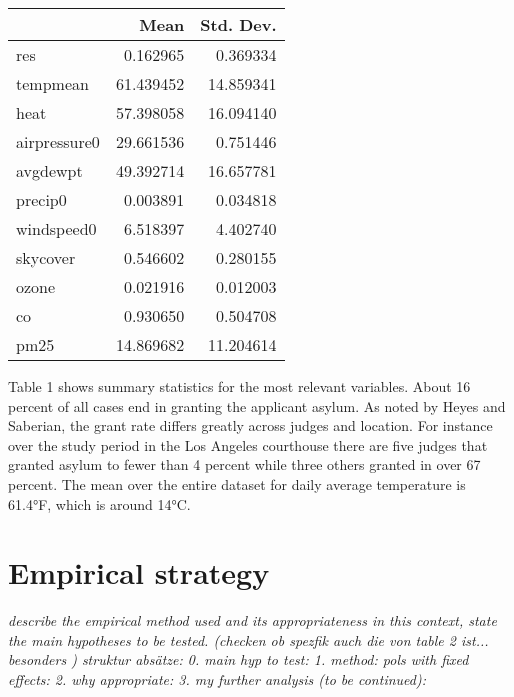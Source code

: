 \documentclass[11pt]{article}
\begin{document}
	\newline	
	\begin{center}
		 \label{tab:title}
		\begin{tabular}{lrr}
			\toprule
			{} &       Mean &  Std. Dev. \\
			\midrule
			res          &   0.162965 &   0.369334 \\
			tempmean     &  61.439452 &  14.859341 \\
			heat         &  57.398058 &  16.094140 \\
			airpressure0 &  29.661536 &   0.751446 \\
			avgdewpt     &  49.392714 &  16.657781 \\
			precip0      &   0.003891 &   0.034818 \\
			windspeed0   &   6.518397 &   4.402740 \\
			skycover     &   0.546602 &   0.280155 \\
			ozone        &   0.021916 &   0.012003 \\
			co           &   0.930650 &   0.504708 \\
			pm25         &  14.869682 &  11.204614 \\
			\bottomrule
		\end{tabular}
	\end{center}
	
	Table 1 shows summary statistics for the most relevant variables. About 16 percent of all cases end in granting the applicant asylum. As noted by Heyes and Saberian, the grant rate differs greatly across judges and location. For instance over the study period in the Los Angeles courthouse there are five judges that granted asylum to fewer than 4 percent while three others granted in over 67 percent. The mean over the entire dataset for daily average temperature is 61.4°F, which is around 14°C.
	\section{Empirical strategy}
	\textit{describe the empirical method used and its appropriateness in this context, state the main hypotheses to be tested. (checken ob spezfik auch die von table 2 ist... besonders )
		struktur absätze: 0. main hyp to test: 1. method: pols with fixed effects: 2. why appropriate: 3. my further analysis (to be continued):
	}
	
\end{document}
